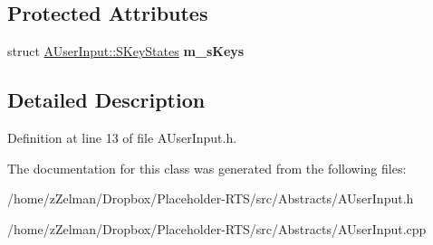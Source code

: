 \subsection*{Protected Attributes}
\begin{DoxyCompactItemize}
\item 
\hypertarget{classAUserInput_a55b881326b920413bbcdf6e02c4fb021}{struct \hyperlink{structAUserInput_1_1SKeyStates}{A\-User\-Input\-::\-S\-Key\-States} {\bfseries m\-\_\-s\-Keys}}\label{classAUserInput_a55b881326b920413bbcdf6e02c4fb021}

\end{DoxyCompactItemize}


\subsection{Detailed Description}


Definition at line 13 of file A\-User\-Input.\-h.



The documentation for this class was generated from the following files\-:\begin{DoxyCompactItemize}
\item 
/home/z\-Zelman/\-Dropbox/\-Placeholder-\/\-R\-T\-S/src/\-Abstracts/A\-User\-Input.\-h\item 
/home/z\-Zelman/\-Dropbox/\-Placeholder-\/\-R\-T\-S/src/\-Abstracts/A\-User\-Input.\-cpp\end{DoxyCompactItemize}
